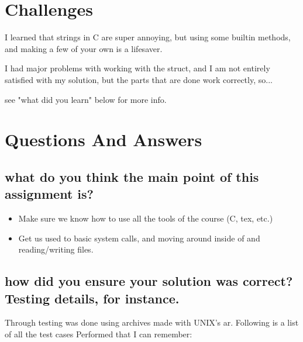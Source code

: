 \documentclass[letterpaper,10pt,titlepage]{article}
\begin{document}
\section{Challenges}

I learned that strings in C are super annoying, but using some builtin methods, and making a few of your own is a lifesaver.

I had major problems with working with the struct, and I am not entirely satisfied with my solution, but the parts that are done work correctly, so...

see "what did you learn" below for more info.

\section{Questions And Answers}

\subsection{what do you think the main point of this assignment is?}

\begin{itemize}
\item Make sure we know how to use all the tools of the course (C, tex, etc.)
\item Get us used to basic system calls, and moving around inside of and reading/writing files.
\end{itemize}

\subsection{how did you ensure your solution was correct? Testing details, for instance.}

Through testing was done using archives made with UNIX's ar.  Following is a list of all the test cases Performed that I can remember:
\end{document}

